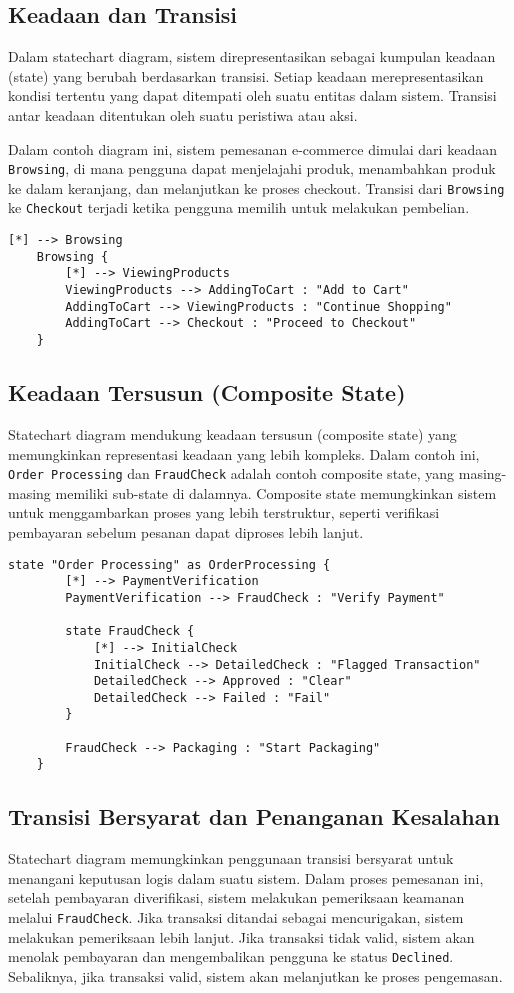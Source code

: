 

\subsection{Keadaan dan Transisi}
Dalam statechart diagram, sistem direpresentasikan sebagai kumpulan keadaan (state) yang berubah berdasarkan transisi. Setiap keadaan merepresentasikan kondisi tertentu yang dapat ditempati oleh suatu entitas dalam sistem. Transisi antar keadaan ditentukan oleh suatu peristiwa atau aksi. 

Dalam contoh diagram ini, sistem pemesanan e-commerce dimulai dari keadaan \texttt{Browsing}, di mana pengguna dapat menjelajahi produk, menambahkan produk ke dalam keranjang, dan melanjutkan ke proses checkout. Transisi dari \texttt{Browsing} ke \texttt{Checkout} terjadi ketika pengguna memilih untuk melakukan pembelian.

\begin{lstlisting}[language=puml]
	[*] --> Browsing
	Browsing {
		[*] --> ViewingProducts
		ViewingProducts --> AddingToCart : "Add to Cart"
		AddingToCart --> ViewingProducts : "Continue Shopping"
		AddingToCart --> Checkout : "Proceed to Checkout"
	}
\end{lstlisting}

\subsection{Keadaan Tersusun (Composite State)}
Statechart diagram mendukung keadaan tersusun (composite state) yang memungkinkan representasi keadaan yang lebih kompleks. Dalam contoh ini, \texttt{Order Processing} dan \texttt{FraudCheck} adalah contoh composite state, yang masing-masing memiliki sub-state di dalamnya. Composite state memungkinkan sistem untuk menggambarkan proses yang lebih terstruktur, seperti verifikasi pembayaran sebelum pesanan dapat diproses lebih lanjut.

\begin{lstlisting}[language=puml]
	state "Order Processing" as OrderProcessing {
		[*] --> PaymentVerification
		PaymentVerification --> FraudCheck : "Verify Payment"
		
		state FraudCheck {
			[*] --> InitialCheck
			InitialCheck --> DetailedCheck : "Flagged Transaction"
			DetailedCheck --> Approved : "Clear"
			DetailedCheck --> Failed : "Fail"
		}
		
		FraudCheck --> Packaging : "Start Packaging"
	}
\end{lstlisting}

\subsection{Transisi Bersyarat dan Penanganan Kesalahan}
Statechart diagram memungkinkan penggunaan transisi bersyarat untuk menangani keputusan logis dalam suatu sistem. Dalam proses pemesanan ini, setelah pembayaran diverifikasi, sistem melakukan pemeriksaan keamanan melalui \texttt{FraudCheck}. Jika transaksi ditandai sebagai mencurigakan, sistem melakukan pemeriksaan lebih lanjut. Jika transaksi tidak valid, sistem akan menolak pembayaran dan mengembalikan pengguna ke status \texttt{Declined}. Sebaliknya, jika transaksi valid, sistem akan melanjutkan ke proses pengemasan.

